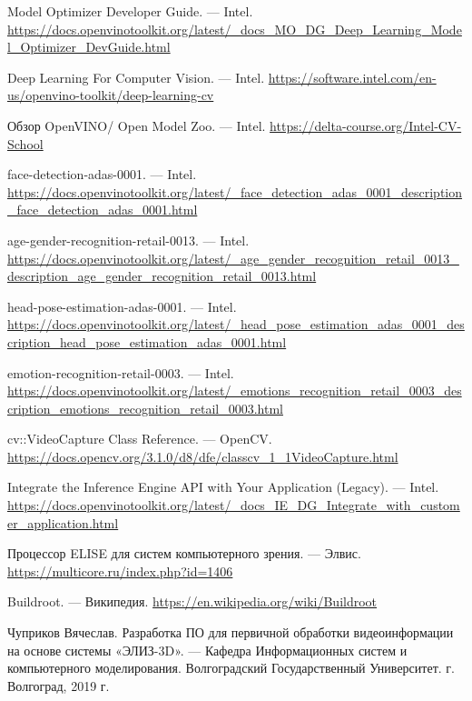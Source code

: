 \documentclass[12pt,a4paper]{scrartcl}
\begin{document}
\begin{thebibliography}{9}
	Model Optimizer Developer Guide.
	\newblock --- Intel. \url{https://docs.openvinotoolkit.org/latest/_docs_MO_DG_Deep_Learning_Model_Optimizer_DevGuide.html}	
	
	Deep Learning For Computer Vision.
	\newblock --- Intel. \url{https://software.intel.com/en-us/openvino-toolkit/deep-learning-cv}
	
	Обзор OpenVINO/ Open Model Zoo.
	\newblock --- Intel. \url{https://delta-course.org/Intel-CV-School}
	
	face-detection-adas-0001.
	\newblock --- Intel. \url{https://docs.openvinotoolkit.org/latest/_face_detection_adas_0001_description_face_detection_adas_0001.html}
	
	age-gender-recognition-retail-0013.
	\newblock --- Intel. \url{https://docs.openvinotoolkit.org/latest/_age_gender_recognition_retail_0013_description_age_gender_recognition_retail_0013.html}
	
	head-pose-estimation-adas-0001.
	\newblock --- Intel. \url{https://docs.openvinotoolkit.org/latest/_head_pose_estimation_adas_0001_description_head_pose_estimation_adas_0001.html}
	
	emotion-recognition-retail-0003.
	\newblock --- Intel. \url{https://docs.openvinotoolkit.org/latest/_emotions_recognition_retail_0003_description_emotions_recognition_retail_0003.html}
	
	cv::VideoCapture Class Reference.
	\newblock --- OpenCV. \url{https://docs.opencv.org/3.1.0/d8/dfe/classcv_1_1VideoCapture.html}
	
	Integrate the Inference Engine API with Your Application (Legacy).
	\newblock --- Intel. \url{https://docs.openvinotoolkit.org/latest/_docs_IE_DG_Integrate_with_customer_application.html}
	
	Процессор ELISE для систем компьютерного зрения.
	\newblock --- Элвис. \url{https://multicore.ru/index.php?id=1406}
	
	Buildroot.
	\newblock --- Википедия. \url{https://en.wikipedia.org/wiki/Buildroot}
	
	Чуприков Вячеслав. Разработка ПО для первичной обработки видеоинформации на основе системы «ЭЛИЗ-3D».
	\newblock --- Кафедра Информационных систем и компьютерного моделирования. Волгоградский Государственный Университет. г. Волгоград, 2019 г.
	

\end{thebibliography}
\end{document}
